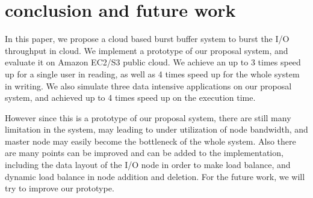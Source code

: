 \section{conclusion and future work}
\label{sec:conclusion}
In this paper, we propose a cloud based burst buffer system to burst the I/O throughput in cloud.
We implement a prototype of our proposal system, and evaluate it on Amazon EC2/S3 public cloud.
We achieve an up to 3 times speed up for a single user in reading, as well as 4 times speed
up for the whole system in writing.
We also simulate three data intensive applications on our proposal system, and achieved up to 4
times speed up on the execution time.

However since this is a prototype of our proposal system, there are still many limitation in the
system, may leading to under utilization of node bandwidth, and master node may easily become the
bottleneck of the whole system.
Also there are many points can be improved and can be added to the implementation, including the
data layout of the I/O node in order to make load balance, and dynamic load balance in node addition
and deletion.
For the future work, we will try to improve our prototype.
